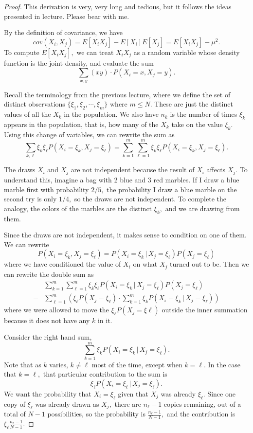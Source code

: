 \documentclass{article}
\begin{document}
\begin{proof}
	This derivation is very, very long and tedious, but it follows the ideas presented in lecture. Please bear with me.

	By the definition of covariance, we have \[cov(X_i, X_j)=E[X_iX_j]-E[X_i]E[X_j] = E[X_iX_j]-\mu^2.\] To compute $E[X_iX_j],$ we can treat $X_iX_j$ as a random variable whose density function is the joint density, and evaluate the sum \[\sum_{x, y} (xy)\cdot P(X_i=x,  X_j=y).\] 

	Recall the terminology from the previous lecture, where we define the set of distinct observations $\{\xi_1, \xi_2,\cdots, \xi_m\}$ where $m\le N.$ These are just the distinct values of all the $X_k$ in the population. We also have $n_k$ is the number of times $\xi_k$ appears in the population, that is, how many of the $X_k$ take on the value $\xi_k.$ Using this change of variables, we can rewrite the sum as \[\sum_{k, \ell} \xi_k \xi_\ell P(X_i = \xi_k, X_j = \xi_\ell) = \sum_{k=1}^m\sum_{\ell=1}^m \xi_k\xi_\ell P(X_i=\xi_k, X_j=\xi_\ell).\] 

	The draws $X_i$ and $X_j$ are not independent because the result of $X_i$ affects $X_j.$ To understand this, imagine a bag with 2 blue and 3 red marbles. If I draw a blue marble first with probability $2/5,$ the probability I draw a blue marble on the second try is only $1/4,$ so the draws are not independent. To complete the analogy, the colors of the marbles are the distinct $\xi_k,$ and we are drawing from them.

	Since the draws are not independent, it makes sense to condition on one of them. We can rewrite \[P(X_i=\xi_k, X_j=\xi_\ell)=P(X_i=\xi_k\, \vert\, X_j=\xi_\ell)P(X_j=\xi_\ell)\] where we have conditioned the value of $X_i$ on what $X_j$ turned out to be. Then we can rewrite the double sum as 
	\begin{align*}
		&\sum_{k=1}^m\sum_{\ell=1}^m \xi_k\xi_\ell P(X_i=\xi_k\, \vert\, X_j=\xi_\ell)P(X_j=\xi_\ell) \\
		= &\sum_{\ell=1}^m \left(\xi_\ell P(X_j=\xi_\ell) \cdot \sum_{k=1}^m \xi_k P(X_i=\xi_k\, \vert\, X_j=\xi_\ell)\right)
\end{align*} where we were allowed to move the $\xi_\ell P(X_j=\xi\ell)$ outside the inner summation because it does not have any $k$ in it. 

	Consider the right hand sum, \[\sum_{k=1}^m \xi_k P(X_i=\xi_k\, \vert\, X_j = \xi_\ell).\] Note that as $k$ varies, $k\neq \ell$ most of the time, except when $k=\ell.$ In the case that $k=\ell,$ that particular contribution to the sum is \[\xi_\ell P(X_i=\xi_\ell\, \vert\, X_j=\xi_\ell).\] We want the probability that $X_i=\xi_\ell$ given that $X_j$ was already $\xi_\ell.$ Since one copy of $\xi_\ell$ was already drawn as $X_j,$ there are $n_\ell-1$ copies remaining, out of a total of $N-1$ possibilities, so the probability is $\frac{n_\ell-1}{N-1},$ and the contribution is $\xi_\ell\frac{n_\ell-1}{N-1}.$ 


\end{proof}
\end{document}
